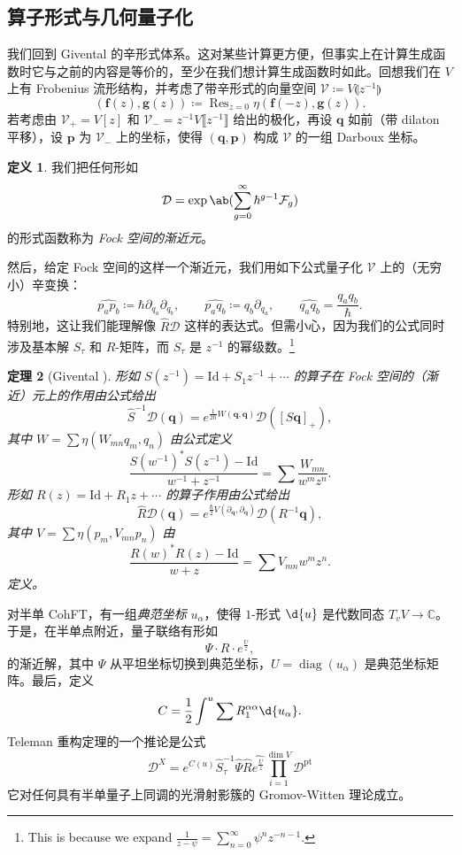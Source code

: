 \documentclass{amsart}
\newtheorem{thm}{定理}[section]
\theoremstyle{definition}
\newtheorem{defn}[thm]{定义}
\theoremstyle{remark}
\theoremstyle{plain}
\theoremstyle{definition}
\theoremstyle{remark}
\newcommand{\C}{\mathbb{C}}
\newcommand{\mc}[1]{\mathcal{#1}}
\newcommand{\mbf}[1]{\mathbf{#1}}
\newcommand{\bq}{\mbf{q}}
\newcommand{\bp}{\mbf{p}}
\newcommand{\mr}[1]{\mathrm{#1}}
\newcommand{\on}[1]{\operatorname{#1}}
\newcommand{\wh}[1]{\widehat{#1}}
\newcommand{\1}{\mathbf{1}}
\newcommand{\2}{\mathbf{2}}
\newcommand{\3}{\mathbf{3}}
\newcommand{\ps}[1]{\llbracket #1 \rrbracket}
\newcommand{\ls}[1]{\llparenthesis #1 \rrparenthesis}
\begin{document}
\subsection{算子形式与几何量子化}%
\label{sub:Operator formalism and geometric quantization}

我们回到 Givental 的辛形式体系。这对某些计算更方便，但事实上在计算生成函数时它与之前的内容是等价的，至少在我们想计算生成函数时如此。回想我们在 \(V\) 上有 Frobenius 流形结构，并考虑了带辛形式的向量空间 \(\mc{V}\coloneqq V\ls{z^{-1}}\)
\[ (\mbf{f}(z), \mbf{g}(z)) \coloneqq \on{Res}_{z=0} \eta(\mbf{f}(-z), \mbf{g}(z)). \]
若考虑由 \(\mc{V}_+ = V[z]\) 和 \(\mc{V}_- = z^{-1}V\ps{z^{-1}}\) 给出的极化，再设 \(\bq\) 如前（带 dilaton 平移），设 \(\bp\) 为 \(\mc{V}_-\) 上的坐标，使得 \((\bq, \bp)\) 构成 \(\mc{V}\) 的一组 Darboux 坐标。

\begin{defn}
    我们把任何形如
    \[ \mc{D} = \exp\ab(\sum_{g=0}^{\infty} \hbar^{g-1} \mc{F}_g) \]
    的形式函数称为 \textit{Fock 空间的渐近元}。
\end{defn}

然后，给定 Fock 空间的这样一个渐近元，我们用如下公式量子化 \(\mc{V}\) 上的（无穷小）辛变换：
\[ \wh{p_a p_b} \coloneqq \hbar \partial_{q_a} \partial_{q_b}, \qquad \wh{p_a q_b} \coloneqq q_b \partial_{q_a}, \qquad \wh{q_a q_b} = \frac{q_a q_b}{\hbar}. \]
特别地，这让我们能理解像 \(\hat{R} \mc{D}\) 这样的表达式。但需小心，因为我们的公式同时涉及基本解 \(S_{\tau}\) 和 \(R\)-矩阵，而 \(S_{\tau}\) 是 \(z^{-1}\) 的幂级数。\footnote{This is because we expand $\frac{1}{z-\psi} = \sum_{n=0}^{\infty} \psi^n z^{-n-1}$.}

\begin{thm}[Givental {\cite{Givental2001quantization}}]
    形如 \(S(z^{-1}) = \mr{Id} + S_1 z^{-1} + \cdots\) 的算子在 Fock 空间的（渐近）元上的作用由公式给出
    \[ \hat{S}^{-1} \mc{D}(\bq) = e^{\frac{1}{2\hbar}W(\bq,\bq)} \mc{D}([S \bq]_+), \]
    其中 \(W = \sum \eta(W_{mn}q_m, q_n)\) 由公式定义
    \[ \frac{S(w^{-1})^* S(z^{-1}) - \mr{Id}}{w^{-1}+z^{-1}} = \sum \frac{W_{mn}}{w^m z^n}. \]
    形如 \(R(z) = \mr{Id} + R_1 z + \cdots\) 的算子作用由公式给出
    \[ \hat{R}\mc{D}(\bq) = e^{\frac{\hbar}{2} V(\partial_{\bq}, \partial_{\bq})} \mc{D}(R^{-1} \bq), \]
    其中 \(V = \sum \eta(p_m, V_{mn} p_n)\) 由
    \[ \frac{R(w)^* R(z) - \mr{Id}}{w+z} = \sum V_{mn} w^m z^n. \]
    定义。
\end{thm}

对半单 CohFT，有一组\textit{典范坐标} \(u_{\alpha}\)，使得 \(1\)-形式 \(\d{u}\) 是代数同态 \(T_v V \to \C\)。于是，在半单点附近，量子联络有形如
\[ \Psi \cdot  R \cdot e^{\frac{U}{z}}, \]
的渐近解，其中 \(\Psi\) 从平坦坐标切换到典范坐标，\(U = \on{diag}(u_{\alpha})\) 是典范坐标矩阵。最后，定义
\[ C = \frac{1}{2} \int^u \sum R_1^{\alpha\alpha} \d{u_{\alpha}}. \]
Teleman 重构定理的一个推论是公式
\[ \mc{D}^X = e^{C(u)} \hat{S}^{-1}_{\tau} \hat{\Psi} \hat{R} \wh{e^{\frac{U}{z}}} \prod_{i=1}^{\dim V} \mc{D}^{\mr{pt}} \]
它对任何具有半单量子上同调的光滑射影簇的 Gromov-Witten 理论成立。
\end{document}
